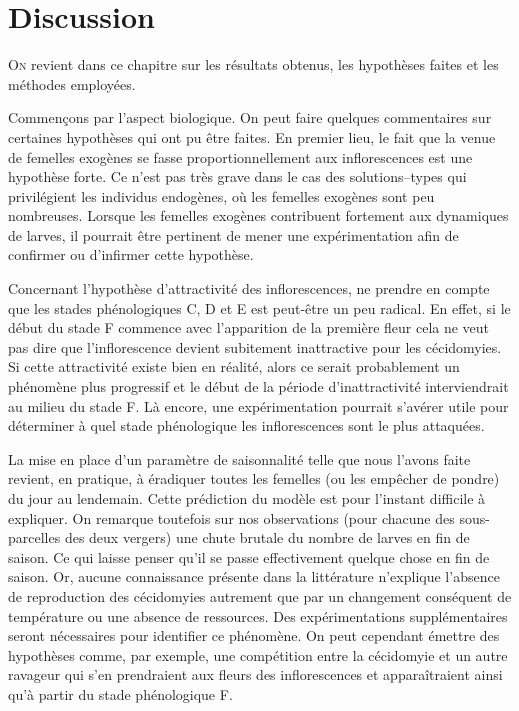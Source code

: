 \chapter{Discussion} 

\lettrine{O}{n} revient dans ce chapitre sur les résultats obtenus, les hypothèses faites et les méthodes employées.

Commençons par l'aspect biologique.
On peut faire quelques commentaires sur certaines hypothèses qui ont pu être faites.
En premier lieu, le fait que la venue de femelles exogènes se fasse proportionnellement aux inflorescences est une hypothèse forte.
Ce n'est pas très grave dans le cas des solutions--types qui privilégient les individus endogènes, où les femelles exogènes sont peu nombreuses.
Lorsque les femelles exogènes contribuent fortement aux dynamiques de larves, il pourrait être pertinent de mener une expérimentation afin de confirmer ou d'infirmer cette hypothèse.

Concernant l'hypothèse d'attractivité des inflorescences, ne prendre en compte que les stades phénologiques C, D et E est peut-être un peu radical.
En effet, si le début du stade F commence avec l'apparition de la première fleur cela ne veut pas dire que l'inflorescence devient subitement inattractive pour les cécidomyies.
Si cette attractivité existe bien en réalité, alors ce serait probablement un phénomène plus progressif et le début de la période d'inattractivité interviendrait au milieu du stade F.
Là encore, une expérimentation pourrait s'avérer utile pour déterminer à quel stade phénologique les inflorescences sont le plus attaquées.

La mise en place d'un paramètre de saisonnalité telle que nous l'avons faite revient, en pratique, à éradiquer toutes les femelles (ou les empêcher de pondre) du jour au lendemain.
Cette prédiction du modèle est pour l'instant difficile à expliquer. 
On remarque toutefois sur nos observations (pour chacune des sous-parcelles des deux vergers) une chute brutale du nombre de larves en fin de saison.
Ce qui laisse penser qu'il se passe effectivement quelque chose en fin de saison.
Or, aucune connaissance présente dans la littérature n'explique l'absence de reproduction des cécidomyies autrement que par un changement conséquent de température ou une absence de ressources.
Des expérimentations supplémentaires seront nécessaires pour identifier ce phénomène.
On peut cependant émettre des hypothèses comme, par exemple, une compétition entre la cécidomyie et un autre ravageur qui s'en prendraient aux fleurs des inflorescences et apparaîtraient ainsi qu'à partir du stade phénologique F.

